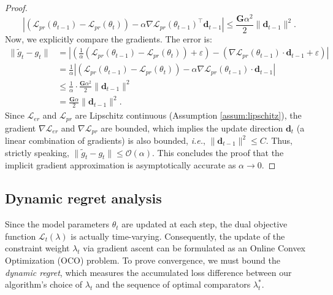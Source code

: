 \begin{proof}
\begin{equation}
    \left| (\mathcal{L}_{pr}(\theta_{t-1}) - \mathcal{L}_{pr}(\theta_{t})) - \alpha \nabla \mathcal{L}_{pr}(\theta_{t-1})^\top \mathbf{d}_{t-1} \right| \le \frac{\mathbf{G} \alpha^2}{2} \|\mathbf{d}_{t-1}\|^2.
\end{equation}
Now, we explicitly compare the gradients. The error is:
\begin{align}
    \| \tilde{g}_t - g_t \| &= \left| \left( \frac{1}{\alpha} (\mathcal{L}_{pr}(\theta_{t-1}) - \mathcal{L}_{pr}(\theta_{t})) + \varepsilon \right) - \left( \nabla \mathcal{L}_{pr}(\theta_{t-1}) \cdot \mathbf{d}_{t-1} + \varepsilon \right) \right| \\
    &= \frac{1}{\alpha} \left| (\mathcal{L}_{pr}(\theta_{t-1}) - \mathcal{L}_{pr}(\theta_{t})) - \alpha \nabla \mathcal{L}_{pr}(\theta_{t-1}) \cdot \mathbf{d}_{t-1} \right| \\
    &\le \frac{1}{\alpha} \cdot \frac{\mathbf{G} \alpha^2}{2} \|\mathbf{d}_{t-1}\|^2 \\
    &= \frac{\mathbf{G} \alpha}{2} \|\mathbf{d}_{t-1}\|^2.
\end{align}
Since $\mathcal{L}_{er}$ and $\mathcal{L}_{pr}$ are Lipschitz continuous (Assumption \ref{assum:lipschitz}), the gradient $\nabla \mathcal{L}_{er}$ and $\nabla \mathcal{L}_{pr}$ are bounded, which implies the update direction $\mathbf{d}_t$ (a linear combination of gradients) is also bounded, \textit{i.e.}, $\|\mathbf{d}_{t-1}\|^2 \le C$. Thus, strictly speaking, $\| \tilde{g}_t - g_t \| \le \mathcal{O}(\alpha)$.
This concludes the proof that the implicit gradient approximation is asymptotically accurate as $\alpha \to 0$.
\end{proof}

\subsection{Dynamic regret analysis}
\label{sec:dynamic_regret}

Since the model parameters $\theta_t$ are updated at each step, the dual objective function $\mathcal{L}_t(\lambda)$ is actually time-varying. Consequently, the update of the constraint weight $\lambda_t$ via gradient ascent can be formulated as an Online Convex Optimization (OCO) problem. To prove convergence, we must bound the \textit{dynamic regret}, which measures the accumulated loss difference between our algorithm's choice of $\lambda_t$ and the sequence of optimal comparators $\lambda_t^*$.

